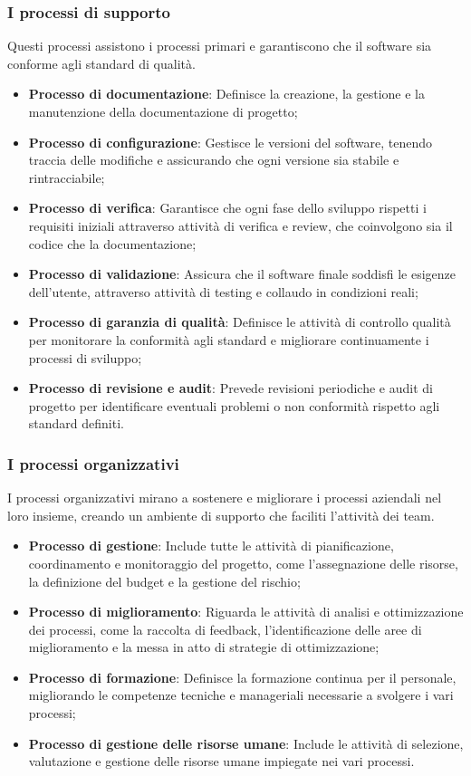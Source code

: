 \subsubsection{I processi di supporto}
Questi processi assistono i processi primari e garantiscono che il software sia conforme agli standard di qualità.
\begin{itemize}
    \item \textbf{Processo di documentazione}: Definisce la creazione, la gestione e la manutenzione della documentazione di progetto;
    \item \textbf{Processo di configurazione}: Gestisce le versioni del software, tenendo traccia delle modifiche e assicurando che ogni versione sia stabile e rintracciabile;
    \item \textbf{Processo di verifica}: Garantisce che ogni fase dello sviluppo rispetti i requisiti iniziali attraverso attività di verifica e review, che coinvolgono sia il codice che la documentazione;
    \item \textbf{Processo di validazione}: Assicura che il software finale soddisfi le esigenze dell'utente, attraverso attività di testing e collaudo in condizioni reali;
    \item \textbf{Processo di garanzia di qualità}: Definisce le attività di controllo qualità per monitorare la conformità agli standard e migliorare continuamente i processi di sviluppo;
    \item \textbf{Processo di revisione e audit}: Prevede revisioni periodiche e audit di progetto per identificare eventuali problemi o non conformità rispetto agli standard definiti.
\end{itemize}

\subsubsection{I processi organizzativi}
I processi organizzativi mirano a sostenere e migliorare i processi aziendali nel loro insieme, creando un ambiente di supporto che faciliti l'attività dei team.
\begin{itemize}
    \item \textbf{Processo di gestione}: Include tutte le attività di pianificazione, coordinamento e monitoraggio del progetto, come l'assegnazione delle risorse, la definizione del budget e la gestione del rischio;
    \item \textbf{Processo di miglioramento}: Riguarda le attività di analisi e ottimizzazione dei processi, come la raccolta di feedback, l'identificazione delle aree di miglioramento e la messa in atto di strategie di ottimizzazione;
    \item \textbf{Processo di formazione}: Definisce la formazione continua per il personale, migliorando le competenze tecniche e manageriali necessarie a svolgere i vari processi;
    \item \textbf{Processo di gestione delle risorse umane}: Include le attività di selezione, valutazione e gestione delle risorse umane impiegate nei vari processi.
\end{itemize}

